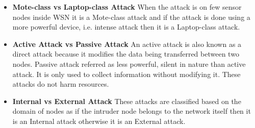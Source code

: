 \begin{itemize}
  \item{ \textbf{Mote-class vs Laptop-class Attack}  When the attack is on few sensor nodes inside WSN it is a Mote-class attack and if the attack is done using a more powerful device, i.e. intense attack then it is a Laptop-class attack.} 
  \item{ \textbf{Active Attack vs Passive Attack} An active attack is also known as a direct attack because it modifies the data being transferred between two nodes. Passive attack referred as less powerful, silent in nature than active attack. It is only used to collect information without modifying it. These attacks do not harm resources.}
  \item{ \textbf{Internal vs External Attack} These attacks are classified based on the domain of nodes as if the intruder node belongs to the network itself then it is an Internal attack otherwise it is an External attack.}
\end{itemize}

\noindent

